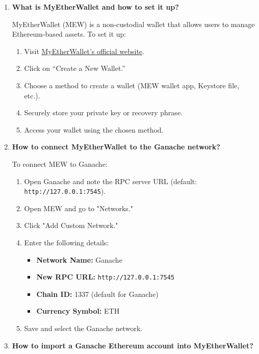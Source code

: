 \documentclass[11pt]{article}
\begin{document}
\begin{enumerate}
    \item \textbf{What is MyEtherWallet and how to set it up?}
    
    MyEtherWallet (MEW) is a non-custodial wallet that allows users to manage Ethereum-based assets. To set it up:
    
    \begin{enumerate}
        \item Visit \href{https://www.myetherwallet.com}{MyEtherWallet's official website}.
        \item Click on “Create a New Wallet.”
        \item Choose a method to create a wallet (MEW wallet app, Keystore file, etc.).
        \item Securely store your private key or recovery phrase.
        \item Access your wallet using the chosen method.
    \end{enumerate}

    \item \textbf{How to connect MyEtherWallet to the Ganache network?}
    
    To connect MEW to Ganache:
    
    \begin{enumerate}
        \item Open Ganache and note the RPC server URL (default: \texttt{http://127.0.0.1:7545}).
        \item Open MEW and go to "Networks."
        \item Click "Add Custom Network."
        \item Enter the following details:
            \begin{itemize}
                \item \textbf{Network Name:} Ganache
                \item \textbf{New RPC URL:} \texttt{http://127.0.0.1:7545}
                \item \textbf{Chain ID:} 1337 (default for Ganache)
                \item \textbf{Currency Symbol:} ETH
            \end{itemize}
        \item Save and select the Ganache network.
    \end{enumerate}

    \item \textbf{How to import a Ganache Ethereum account into MyEtherWallet?}
    

\end{enumerate}
\end{document}
